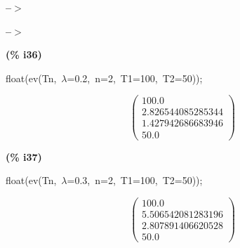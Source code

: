 \documentclass[fleqn]{article}
\begin{document}
\noindent
\begin{minipage}[t]{4.000000em}\color{red}\bfseries
 --\ensuremath{\ensuremath{>}}	
\end{minipage}
\begin{minipage}[t]{\textwidth}\color{blue}

\end{minipage}

\noindent%



\noindent
\begin{minipage}[t]{4.000000em}\color{red}\bfseries
 --\ensuremath{\ensuremath{>}}	
\end{minipage}
\begin{minipage}[t]{\textwidth}\color{blue}

\end{minipage}

\noindent%



\noindent
\begin{minipage}[t]{4.000000em}\color{red}\bfseries
(\% i36)	
\end{minipage}
\begin{minipage}[t]{\textwidth}\color{blue}
float(ev(Tn,\ \ensuremath{\lambda}=0.2,\ n=2,\ T1=100,\ T2=50));
\end{minipage}
\[\displaystyle \tag{\% o36} 
\begin{pmatrix}100.0\\
2.826544085285344\\
1.427942686683946\\
50.0\end{pmatrix}\mbox{}
\]


\noindent
\begin{minipage}[t]{4.000000em}\color{red}\bfseries
(\% i37)	
\end{minipage}
\begin{minipage}[t]{\textwidth}\color{blue}
float(ev(Tn,\ \ensuremath{\lambda}=0.3,\ n=2,\ T1=100,\ T2=50));
\end{minipage}
\[\displaystyle \tag{\% o37} 
\begin{pmatrix}100.0\\
5.506542081283196\\
2.807891406620528\\
50.0\end{pmatrix}\mbox{}
\]
\end{document}
